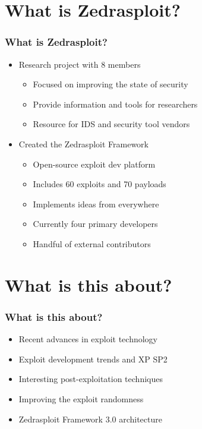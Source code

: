 \documentclass{beamer}
\newenvironment{sitemize}{\vspace{1mm}\begin{itemize}\itemsep 4pt\small}{\end{itemize}}
\begin{document}
\section{What is Zedrasploit?}
\begin{frame}[t]
  \frametitle{What is Zedrasploit?}
	\begin{sitemize}
		\item Research project with 8 members 
		\begin{sitemize}
			\item Focused on improving the state of security
			\item Provide information and tools for researchers
			\item Resource for IDS and security tool vendors
		\end{sitemize}
	\end{sitemize}
	
	\begin{sitemize}			
		\item Created the Zedrasploit Framework
		\begin{sitemize}
			\item Open-source exploit dev platform
			\item Includes 60 exploits and 70 payloads
			\item Implements ideas from everywhere
			\item Currently four primary developers
			\item Handful of external contributors
		\end{sitemize}
	\end{sitemize}
\end{frame}

\section{What is this about?}
\begin{frame}[t]
  \frametitle{What is this about?}
	\begin{sitemize}
		\item Recent advances in exploit technology
		\item Exploit development trends and XP SP2
		\item Interesting post-exploitation techniques	
		\item Improving the exploit randomness
		\item Zedrasploit Framework 3.0 architecture
	\end{sitemize}  
\end{frame}
\end{document}
